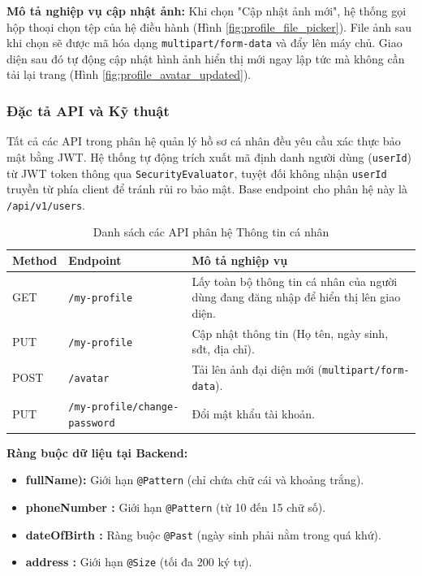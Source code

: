\noindent\textbf{Mô tả nghiệp vụ cập nhật ảnh:} Khi chọn "Cập nhật ảnh mới", hệ thống gọi hộp thoại chọn tệp của hệ điều hành (Hình \ref{fig:profile_file_picker}). File ảnh sau khi chọn sẽ được mã hóa dạng \texttt{multipart/form-data} và đẩy lên máy chủ. Giao diện sau đó tự động cập nhật hình ảnh hiển thị mới ngay lập tức mà không cần tải lại trang (Hình \ref{fig:profile_avatar_updated}).

\vspace{0.5cm}
\subsubsection{Đặc tả API và Kỹ thuật}

Tất cả các API trong phân hệ quản lý hồ sơ cá nhân đều yêu cầu xác thực bảo mật bằng JWT. Hệ thống tự động trích xuất mã định danh người dùng (\texttt{userId}) từ JWT token thông qua \texttt{SecurityEvaluator}, tuyệt đối không nhận \texttt{userId} truyền từ phía client để tránh rủi ro bảo mật. Base endpoint cho phân hệ này là \texttt{/api/v1/users}.

\begin{table}[H]
    \centering
    \caption{Danh sách các API phân hệ Thông tin cá nhân}
    \renewcommand{\arraystretch}{1.3}
    \begin{tabularx}{\textwidth}{|l|l|X|}
        \hline
        \textbf{Method} & \textbf{Endpoint} & \textbf{Mô tả nghiệp vụ} \\ \hline
        GET & \texttt{/my-profile} & Lấy toàn bộ thông tin cá nhân của người dùng đang đăng nhập để hiển thị lên giao diện. \\ \hline
        PUT & \texttt{/my-profile} & Cập nhật thông tin (Họ tên, ngày sinh, sđt, địa chỉ). \\ \hline
        POST & \texttt{/avatar} & Tải lên ảnh đại diện mới (\texttt{multipart/form-data}). \\ \hline
        PUT & \texttt{/my-profile/change-password} & Đổi mật khẩu tài khoản. \\ \hline
    \end{tabularx}
\end{table}

\noindent\textbf{Ràng buộc dữ liệu tại Backend:}
\begin{itemize}
    \item \textbf{fullName):} Giới hạn \texttt{@Pattern} (chỉ chứa chữ cái và khoảng trắng).
    \item \textbf{phoneNumber :} Giới hạn \texttt{@Pattern} (từ 10 đến 15 chữ số).
    \item \textbf{dateOfBirth :} Ràng buộc \texttt{@Past} (ngày sinh phải nằm trong quá khứ).
    \item \textbf{address :} Giới hạn \texttt{@Size} (tối đa 200 ký tự).
\end{itemize}


